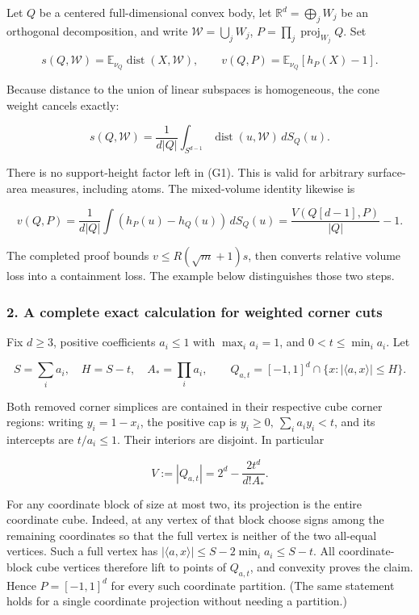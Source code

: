 \documentclass[
  11pt,
]{article}
\begin{document}
Let \(Q\) be a centered full-dimensional convex body, let
\(\mathbb R^d=\bigoplus_j W_j\) be an orthogonal decomposition, and
write \(\mathcal W=\bigcup_jW_j\),
\(P=\prod_j\operatorname{proj}_{W_j}Q\). Set

\[
s(Q,\mathcal W)=\mathbb E_{\nu_Q}\operatorname{dist}(X,\mathcal W),
\qquad
v(Q,P)=\mathbb E_{\nu_Q}[h_P(X)-1].
\]

Because distance to the union of linear subspaces is homogeneous, the
cone weight cancels exactly:

\[
s(Q,\mathcal W)=\frac1{d|Q|}\int_{S^{d-1}}
       \operatorname{dist}(u,\mathcal W)\,dS_Q(u).       \tag{G1}
\]

There is no support-height factor left in (G1). This is valid for
arbitrary surface-area measures, including atoms. The mixed-volume
identity likewise is

\[
v(Q,P)=\frac1{d|Q|}\int(h_P(u)-h_Q(u))\,dS_Q(u)
       =\frac{V(Q[d-1],P)}{|Q|}-1.                    \tag{G2}
\]

The completed proof bounds \(v\le R(\sqrt m+1)s\), then converts
relative volume loss into a containment loss. The example below
distinguishes those two steps.

\subsubsection{2. A complete exact calculation for weighted corner
cuts}\label{a-complete-exact-calculation-for-weighted-corner-cuts}

Fix \(d\ge3\), positive coefficients \(a_i\le1\) with \(\max_i a_i=1\),
and \(0<t\le\min_i a_i\). Let

\[
S=\sum_i a_i,\quad H=S-t,\quad A_* =\prod_i a_i,\qquad
Q_{a,t}=[-1,1]^d\cap\{x:|\langle a,x\rangle|\le H\}.      \tag{G3}
\]

Both removed corner simplices are contained in their respective cube
corner regions: writing \(y_i=1-x_i\), the positive cap is
\(y_i\ge0,\ \sum_i a_i y_i<t\), and its intercepts are \(t/a_i\le1\).
Their interiors are disjoint. In particular

\[
V:=|Q_{a,t}|=2^d-\frac{2t^d}{d!A_*}.                      \tag{G4}
\]

For any coordinate block of size at most two, its projection is the
entire coordinate cube. Indeed, at any vertex of that block choose signs
among the remaining coordinates so that the full vertex is neither of
the two all-equal vertices. Such a full vertex has
\(|\langle a,x\rangle|\le S-2\min_i a_i\le S-t\). All coordinate-block
cube vertices therefore lift to points of \(Q_{a,t}\), and convexity
proves the claim. Hence \(P=[-1,1]^d\) for every such coordinate
partition. (The same statement holds for a single coordinate projection
without needing a partition.)
\end{document}
